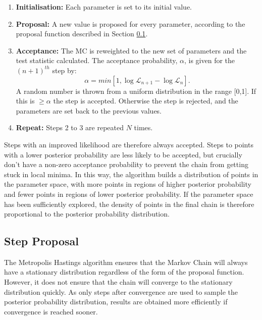 \begin{enumerate}
\item \textbf{Initialisation:} Each parameter is set to its initial value. \\
\item \textbf{Proposal:} A new value is proposed for every parameter, according to the proposal function described in Section \ref{sec:stepprop}. \\
\item \textbf{Acceptance:} The MC is reweighted to the new set of parameters and the test statistic calculated. The acceptance probability, $\alpha$, is given for the $(n+1)^{th}$ step by:
\begin{equation}
\alpha = min[1, \log\mathcal{L}_{n+1} - \log \mathcal{L}_{n}].
\end{equation}
 A random number is thrown from a uniform distribution in the range [0,1]. If this is $\geq \alpha$ the step is accepted. Otherwise the step is rejected, and the parameters are set back to the previous values.  \\
\item \textbf{Repeat:} Steps 2 to 3 are repeated $N$ times. \\
\end{enumerate}

Steps with an improved likelihood are therefore always accepted. Steps to points with a lower posterior probability are less likely to be accepted, but crucially don't have a non-zero acceptance probability to prevent the chain from getting stuck in local minima. In this way, the algorithm builds a distribution of points in the parameter space, with more points in regions of higher posterior probability and fewer points in regions of lower posterior probability. If the parameter space has been sufficiently explored, the density of points in the final chain is therefore proportional to the posterior probability distribution. 

\subsection{Step Proposal}\label{sec:stepprop}

The Metropolis Hastings algorithm ensures that the Markov Chain will always have a stationary distribution regardless of the form of the proposal function. However, it does not ensure that the chain will converge to the stationary distribution quickly. As only steps after convergence are used to sample the posterior probability distribution, results are obtained more efficiently if convergence is reached sooner. 

